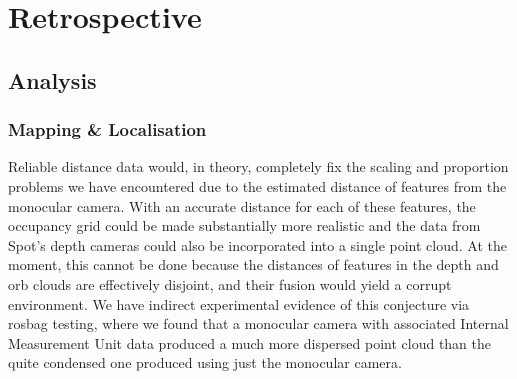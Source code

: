 \documentclass[10pt,english]{article}
\begin{document}
\vspace*{\fill}
\begin{center} %
    \linebreak
    \linebreak
\end{center}

\clearpage

\section*{Retrospective}

\subsection*{Analysis}


\subsubsection*{Mapping \& Localisation}

Reliable distance data would, in theory, completely fix the scaling and proportion problems we have encountered due to the estimated distance of features from the monocular camera. With an accurate distance for each of these features, the occupancy grid could be made substantially more realistic and the data from Spot's depth cameras could also be incorporated into a single point cloud. At the moment, this cannot be done because the distances of features in the depth and orb clouds are effectively disjoint, and their fusion would yield a corrupt environment. We have indirect experimental evidence of this conjecture via rosbag testing, where we found that a monocular camera with associated Internal Measurement Unit data produced a much more dispersed point cloud than the quite condensed one produced using just the monocular camera. %
\end{document}
